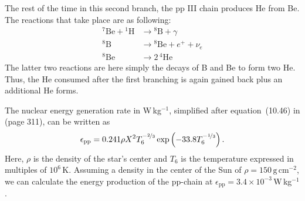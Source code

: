 The rest of the time in this second branch, the pp III chain produces He from Be. The reactions that take place are as following:
\begin{align}
    {^7}\mathrm{Be} + {^1}\mathrm{H} &\longrightarrow {^8}\mathrm{B} + \gamma \\
    {^8}\mathrm{B} &\longrightarrow {^8}\mathrm{Be} + e^+ + \nu_e\\
    {^8}\mathrm{Be} &\longrightarrow 2\,{^4}\mathrm{He}
\end{align}
The latter two reactions are here simply the decays of B and Be to form two He. Thus, the He consumed after the first branching is again gained back plus an additional He forms.

The nuclear energy generation rate in W\,kg$^{-1}$, simplified after equation~(10.46) in \citet{carroll17} (page 311), can be written as
\begin{equation}
    \epsilon_\mathrm{pp} = 0.241 \rho X^2 T_6^{-\nicefrac{2}{3}} \exp\left(-33.8 T_6^{-\nicefrac{1}{3}}\right). \label{eqn:sun:energy_generation_pp-chain}
\end{equation}
Here, $\rho$ is the density of the star's center and $T_6$ is the temperature expressed in multiples of $10^6$\,K. Assuming a density in the center of the Sun of $\rho = 150\,\mathrm{g}\,\mathrm{cm}^{-2}$, we can calculate the energy production of the \ac{pp-chain} at $\epsilon_\mathrm{pp} = 3.4 \times 10^{-3}\,$W\,kg$^{-1}$.


